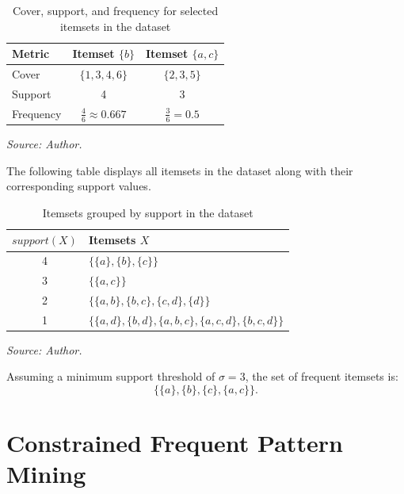 \begin{table}[h!]
\centering
\caption{Cover, support, and frequency for selected itemsets in the dataset}
\begin{threeparttable}
\label{tab:itemset_metrics}
\begin{tabular}{|l|c|c|}
\hline
\textbf{Metric} & \textbf{Itemset $\{b\}$} & \textbf{Itemset $\{a, c\}$} \\
\hline
Cover & $\{1, 3, 4, 6\}$ & $\{2, 3, 5\}$ \\
Support & 4 & 3 \\
Frequency & $\frac{4}{6} \approx 0.667$ & $\frac{3}{6} = 0.5$ \\
\hline
\end{tabular}
\begingroup
\let\item\relax
\item \textit{Source: Author.}
\endgroup
\end{threeparttable}
\end{table}

The following table displays all itemsets in the dataset along with their corresponding support values.

\begin{table}[h!]
\centering
\caption{Itemsets grouped by support in the dataset}
\begin{threeparttable}
\label{tab:frequency_groups}
\begin{tabular}{|c|l|}
\hline
\textbf{$support(X)$} & \textbf{Itemsets $X$} \\
\hline
4 & $\{\{a\}, \{b\}, \{c\}\}$ \\
3 & $\{\{a,c\}\}$ \\
2 & $\{\{a,b\}, \{b,c\}, \{c,d\}, \{d\}\}$ \\
1 & $\{\{a,d\}, \{b,d\}, \{a,b,c\}, \{a,c,d\}, \{b,c,d\}\}$ \\
\hline
\end{tabular}
\begingroup
\let\item\relax
\item \textit{Source: Author.}
\endgroup
\end{threeparttable}
\end{table}

Assuming a minimum support threshold of $\sigma = 3$, the set of frequent itemsets is:
\[
\{\{a\}, \{b\}, \{c\}, \{a,c\}\}.
\]

\section{Constrained Frequent Pattern Mining}

